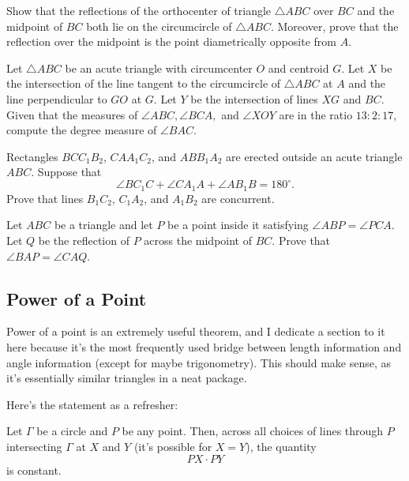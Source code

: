 \documentclass{scrartcl}
\providecommand{\dg}{^\circ}
\begin{document}
\begin{problem}
	Show that the reflections of the orthocenter of triangle $\triangle ABC$
	over $BC$ and the midpoint of $BC$ both lie on the circumcircle
	of $\triangle ABC$. Moreover, prove that the reflection over the midpoint
	is the point diametrically opposite from $A$.
\end{problem}

\begin{problem}[2021 AIME II/14]
	Let $\triangle ABC$ be an acute triangle with circumcenter $O$ and
	centroid $G$. Let $X$ be the intersection of the line tangent
	to the circumcircle of $\triangle ABC$ at $A$ and the line
	perpendicular to $GO$ at $G$.
	Let $Y$ be the intersection of lines $XG$ and $BC$.
	Given that the measures of $\angle ABC, \angle BCA,$ and $\angle XOY$
	are in the ratio $13 : 2 : 17$, compute the degree measure of $\angle BAC$. 
\end{problem}

\begin{niceprob}[USAMO 2021/1]
	Rectangles $BCC_1B_2$, $CAA_1C_2$, and $ABB_1A_2$ are erected
	outside an acute triangle $ABC$. Suppose that
	\[\angle BC_1C + \angle CA_1A + \angle AB_1B = 180\dg.\]
	Prove that lines $B_1C_2$, $C_1A_2$, and $A_1B_2$ are concurrent.
\end{niceprob}

\begin{niceprob}
	Let $ABC$ be a triangle and let $P$ be a point inside it satisfying
	$\angle ABP = \angle PCA$. Let $Q$ be the reflection of $P$
	across the midpoint of $BC$. Prove that $\angle BAP = \angle CAQ$.
\end{niceprob}

\pagebreak
\subsection{Power of a Point}
Power of a point is an extremely useful theorem,
and I dedicate a section to it here because it's the most frequently used
bridge between length information and angle information
(except for maybe trigonometry).
This should make sense, as it's essentially similar triangles in a neat package.

Here's the statement as a refresher:
\begin{theorem}
	Let $\Gamma$ be a circle and $P$ be any point. Then, across all choices of
	lines through $P$ intersecting $\Gamma$ at $X$ and $Y$
	(it's possible for $X = Y$), the quantity
	\[PX\cdot PY\]
	is constant.
\end{theorem}
\end{document}
